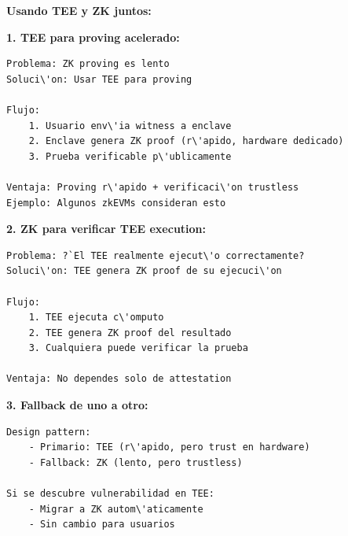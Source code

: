 \documentclass[11pt,a4paper,twoside]{book}
\begin{document}
\begin{remark}
\textbf{Usando TEE y ZK juntos:}

\textbf{1. TEE para proving acelerado:}
\begin{verbatim}
Problema: ZK proving es lento
Soluci\'on: Usar TEE para proving

Flujo:
    1. Usuario env\'ia witness a enclave
    2. Enclave genera ZK proof (r\'apido, hardware dedicado)
    3. Prueba verificable p\'ublicamente
    
Ventaja: Proving r\'apido + verificaci\'on trustless
Ejemplo: Algunos zkEVMs consideran esto
\end{verbatim}

\textbf{2. ZK para verificar TEE execution:}
\begin{verbatim}
Problema: ?`El TEE realmente ejecut\'o correctamente?
Soluci\'on: TEE genera ZK proof de su ejecuci\'on

Flujo:
    1. TEE ejecuta c\'omputo
    2. TEE genera ZK proof del resultado
    3. Cualquiera puede verificar la prueba
    
Ventaja: No dependes solo de attestation
\end{verbatim}

\textbf{3. Fallback de uno a otro:}
\begin{verbatim}
Design pattern:
    - Primario: TEE (r\'apido, pero trust en hardware)
    - Fallback: ZK (lento, pero trustless)
    
Si se descubre vulnerabilidad en TEE:
    - Migrar a ZK autom\'aticamente
    - Sin cambio para usuarios
\end{verbatim}
\end{remark}
\end{document}

